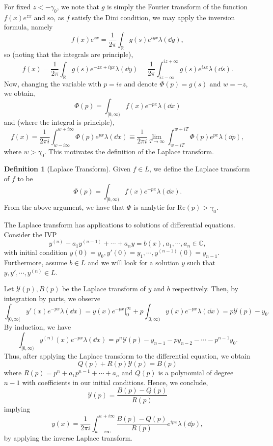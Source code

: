 \documentclass[]{article}
\theoremstyle{definition}
\theoremstyle{definition}
\newtheorem{definition}{Definition}[section]
\begin{document}
For fixed \(z < -\gamma_0\), we note that \(g\) is simply the Fourier transform 
of the function \(f(x)e^{zx}\) and so, as \(f\) satisfy the Dini condition, 
we may apply the inversion formula, namely 
\[f(x)e^{zx} = \frac{1}{2\pi}\int_{\mathbb{R}}g(s)e^{iyx}\lambda(\dd y),\]
so (noting that the integrals are principle),
\[f(x) = \frac{1}{2\pi}\int_{\mathbb{R}}g(s)e^{-zx + iyx}\lambda(\dd y) 
  = \frac{1}{2\pi}\int_{iz-\infty}^{iz + \infty}g(s)e^{isx} \lambda(\dd s).\]
Now, changing the variable with \(p = is\) and denote \(\Phi(p) = g(s)\) and 
\(w = -z\),
we obtain,
\[\Phi(p) = \int_{[0, \infty)}f(x)e^{-px} \lambda(\dd x)\]
and (where the integral is principle),
\[f(x) = \frac{1}{2\pi i} \int_{w - i\infty}^{w + i\infty} \Phi(p)e^{px}\lambda(\dd x)
  \equiv \frac{1}{2\pi i} \lim_{T \to \infty}\int_{w - iT}^{w + iT} \Phi(p)e^{px}\lambda(\dd p),\]
where \(w > \gamma_0\). This motivates the definition of the Laplace transform.

\begin{definition}[Laplace Transform]
  Given \(f \in L\), we define the Laplace transform of \(f\) to be 
  \[\Phi(p) = \int_{[0, \infty)}f(x)e^{-px} \lambda(\dd x).\]
  From the above argument, we have that \(\Phi\) is analytic for 
  \(\text{Re}(p) > \gamma_0\).
\end{definition}

The Laplace transform has applications to solutions of differential equations. 
Consider the IVP
\[y^{(n)} + a_1 y^{(n - 1)} + \cdots + a_n y = b(x), a_1, \cdots, a_n \in \mathbb{C},\]
with initial condition \(y(0) = y_0, y'(0) = y_1, \cdots, y^{(n - 1)}(0) = y_{n - 1}\).
Furthermore, assume \(b \in L\) and we will look for a solution \(y\) such that 
\(y, y', \cdots, y^{(n)} \in L\). 

Let \(\mathcal{Y}(p), B(p)\) be the Laplace transform of \(y\) and \(b\) respectively. 
Then, by integration by parts, we observe 
\[\int_{[0, \infty)} y'(x)e^{-px} \lambda(\dd x) = 
 y(x)e^{-px}|_0^\infty + p\int_{[0, \infty)} y(x)e^{-px}\lambda(\dd x) 
 = p\mathcal{Y}(p) - y_0.\]
By induction, we have 
\[\int_{[0, \infty)} y^{(n)}(x)e^{-px} \lambda(\dd x) = 
  p^n\mathcal{Y}(p) - y_{n - 1} - py_{n - 2} - \cdots - p^{n - 1}y_0.\]
Thus, after applying the Laplace transform to the differential equation, we 
obtain 
\[Q(p) + R(p)\mathcal{Y}(p) = B(p)\]
where \(R(p) = p^n + a_1p^{n - 1} + \cdots + a_n\) and \(Q(p)\) is a polynomial 
of degree \(n - 1\) with coefficients in our initial conditions. Hence, 
we conclude, 
\[\mathcal{Y}(p) = \frac{B(p) - Q(p)}{R(p)}\]
implying 
\[y(x) = \frac{1}{2\pi i} 
  \int_{w - i\infty}^{w + i\infty} \frac{B(p) - Q(p)}{R(p)} e^{ipx} \lambda(\dd p),\]
by applying the inverse Laplace transform.
\end{document}
